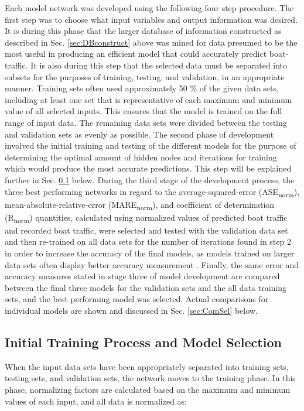 \documentclass[
10pt, %
letterpaper, %
twoside, %
headinclude,footinclude, %
BCOR5mm, %
]{scrartcl}
\def\SPSB#1#2{\rlap{\textsuperscript{\textcolor{black}{#1}}}\SB{#2}}
\def\SB#1{\textsubscript{\textcolor{black}{#1}}}
\begin{document}
Each model network was developed using the following four step procedure. The first step was to choose what input variables and output information was desired. It is during this phase that the larger database of information constructed as described in Sec. \ref{sec:DBconstruct} above was mined for data presumed to be the most useful in producing an efficient model that could accurately predict boat-traffic. It is also during this step that the selected data must be separated into subsets for the purposes of training, testing, and validation, in an appropriate manner. Training sets often used approximately 50 \% of the given data sets, including at least one set that is representative of each maximum and minimum value of all selected inputs. This ensures that the model is trained on the full range of input data. The remaining data sets were divided between the testing and validation sets as evenly as possible. The second phase of development involved the initial training and testing of the different models for the purpose of determining the optimal amount of hidden nodes and iterations for training which would produce the most accurate predictions. This step will be explained further in Sec. \ref{sec:TrainTest} below. During the third stage of the development process, the three best performing networks in regard to the average-squared-error (ASE\SB{norm}), mean-absolute-relative-error (MARE\SB{norm}), and coefficient of determination (R\SPSB{2}{norm}) quantities, calculated using normalized values of predicted boat traffic and recorded boat traffic, were selected and tested with the validation data set and then re-trained on all data sets for the number of iterations found in step 2 in order to increase the accuracy of the final models, as models trained on larger data sets often display better accuracy measurement \cite{yasarer2012development}. Finally, the same error and accuracy measures stated in stage three of model development are compared between the final three models for the validation sets and the all data training sets, and the best performing model was selected. Actual comparisons for individual models are shown and discussed in Sec. \ref{sec:ComSel} below.

\subsection{Initial Training Process and Model Selection} \label{sec:TrainTest}

When the input data sets have been appropriately separated into training sets, testing sets, and validation sets, the network moves to the training phase. In this phase, normalizing factors are calculated based on the maximum and minimum values of each input, and all data is normalized as:
\end{document}
